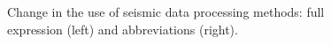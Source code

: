\documentclass[geosciences,article,submit,moreauthors,pdftex]{Definitions/mdpi}
\begin{document}
\begin{figure}[ht!]

\begin{minipage}{0.49\linewidth}
\end{minipage}
\hfill
\begin{minipage}{0.49\linewidth}
\end{minipage}

\caption{Change in the use of seismic data processing methods: full expression (left) and abbreviations (right).}
\label{fwi_psdm}
\end{figure}
\end{document}
